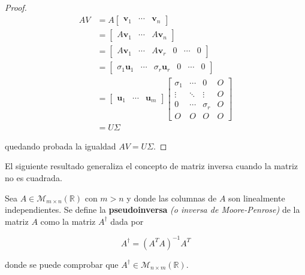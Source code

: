 \begin{proof}
    \begin{align*}
        A V &= A \begin{bmatrix} \mathbf{v}_1 & \cdots & \mathbf{v}_n \end{bmatrix} \\
            &= \begin{bmatrix} A \mathbf{v}_1 & \cdots & A \mathbf{v}_n \end{bmatrix} \\
            &= \begin{bmatrix} A \mathbf{v}_1 & \cdots & A \mathbf{v}_r & 0 & \cdots & 0 \end{bmatrix} \\
            &= \begin{bmatrix} \sigma_1 \mathbf{u}_1 & \cdots & \sigma_r \mathbf{u}_r & 0 & \cdots & 0 \end{bmatrix} \\
            &= \begin{bmatrix} \mathbf{u}_1 & \cdots & \mathbf{u}_m \end{bmatrix}
               \begin{bmatrix} 
                   \sigma_1 & \cdots & 0 & O \\
                   \vdots & \ddots & \vdots & O \\
                   0 & \cdots & \sigma_r & O \\
                   O & O & O & O
               \end{bmatrix} \\
            &= U \Sigma
    \end{align*}

    quedando probada la igualdad $AV = U \Sigma$.\newline
\end{proof}

El siguiente resultado generaliza el concepto de matriz inversa cuando la matriz no es cuadrada.
\begin{definicion}[Pseudoinversa]
    Sea $A \in \mathcal{M}_{m \times n}(\mathbb{R})$ con $m > n$ y donde las columnas de $A$ son linealmente independientes. Se define la \textbf{pseudoinversa} \emph{(o inversa de Moore-Penrose)} de la matriz $A$ como la matriz $A^{\dagger}$ dada por

    \[ A^{\dagger} = {(A^{T}A)}^{-1}A^{T} \]

    donde se puede comprobar que $A^{\dagger} \in \mathcal{M}_{n \times m}(\mathbb{R})$.\newline
\end{definicion}

